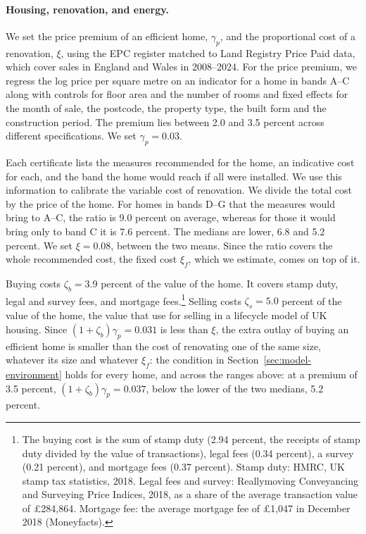 \paragraph{Housing, renovation, and energy.}
We set the price premium of an efficient home, $\gamma_p$, and the proportional
cost of a renovation, $\xi$, using the EPC register matched to Land
Registry Price Paid data, which cover sales in England and Wales in 2008--2024. For the  price premium, we regress the log price per square metre on an
indicator for a home in bands A--C along with controls for floor area and the
number of rooms and fixed effects for the month of sale, the postcode, the
property type, the built form and the construction period. The premium lies between 2.0 and 3.5
percent across different specifications. We set $\gamma_p=0.03$. 


Each  certificate lists the measures recommended for the
home, an indicative cost for each, and the band the home would reach if
all were installed. We use this information to calibrate  the variable cost of renovation. We divide the total cost by the price of the home. For
homes in bands D--G that the measures would bring to A--C, the ratio is 9.0
percent on average, whereas for those it would bring only to band C it is 7.6 percent. The
medians are lower, 6.8 and 5.2 percent. We set $\xi=0.08$, between the two means.
Since the ratio covers the whole recommended cost, the fixed cost $\xi_f$,
which we estimate, comes on top of it. 

 Buying costs $\zeta_b=3.9$ percent of the value of the home. It covers
stamp duty, legal and survey fees, and mortgage fees.\footnote{The buying cost is the sum of stamp
duty (2.94 percent, the receipts of stamp duty divided by the value of
transactions), legal fees (0.34 percent), a survey (0.21 percent), and
mortgage fees (0.37 percent). Stamp duty: HMRC, UK stamp tax statistics,
2018. Legal fees and survey: Reallymoving Conveyancing and Surveying Price
Indices, 2018, as a share of the average transaction value of
\pounds284,864. Mortgage fee: the average mortgage fee of
\pounds1,047 in December 2018 (Moneyfacts).} Selling costs $\zeta_s=5.0$
percent of the value of the home, the value that
\citet{attanasio2012modelling} use for selling in a lifecycle model of UK
housing. Since $(1+\zeta_b)\gamma_p=0.031$ is less than
$\xi$, the extra outlay of buying an efficient home is smaller than the cost of
renovating one of the same size, whatever its size and whatever $\xi_f$: the
condition in
Section~\ref{sec:model-environment} holds for every home, and across the
ranges above: at a premium of 3.5 percent, $(1+\zeta_b)\gamma_p=0.037$,
below the lower of the two medians, 5.2 percent.


